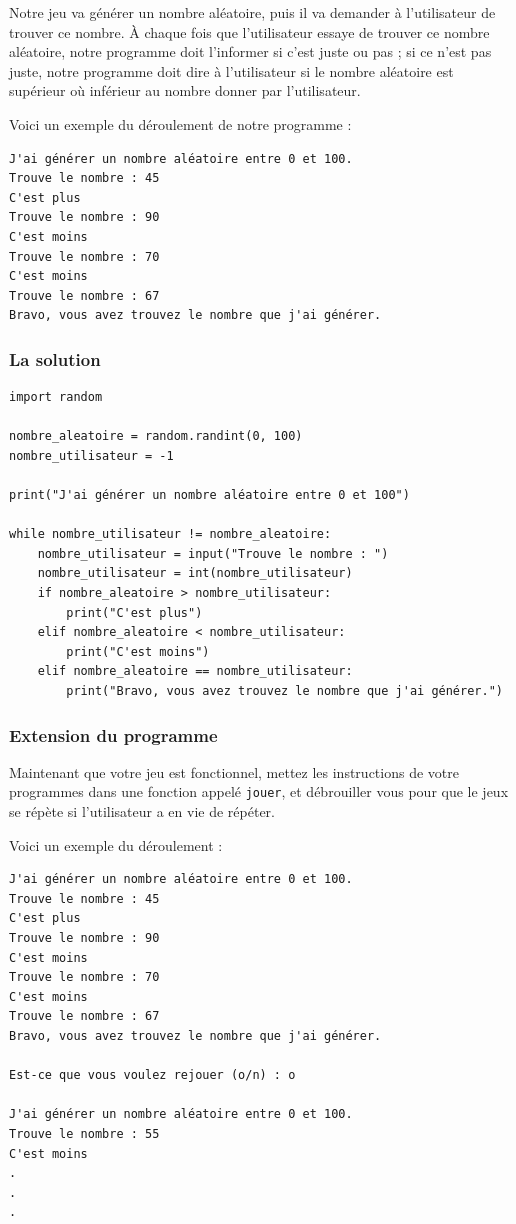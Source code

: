 \documentclass[12pt]{article}
\newcommand{\code}[1]{\colorbox{light-gray}{\texttt{#1}}}
\begin{document}
        Notre jeu va générer un nombre aléatoire, puis il va demander à l'utilisateur de trouver ce nombre. À chaque
        fois que l'utilisateur essaye de trouver ce nombre aléatoire, notre programme doit l'informer si c'est juste 
        ou pas ; si ce n'est pas juste, notre programme doit dire à l'utilisateur si le nombre aléatoire est supérieur 
        où inférieur au nombre donner par l'utilisateur. 

        Voici un exemple du déroulement de notre programme :
        \begin{lstlisting}[style=exec_result]
J'ai générer un nombre aléatoire entre 0 et 100.
Trouve le nombre : 45
C'est plus
Trouve le nombre : 90
C'est moins
Trouve le nombre : 70
C'est moins
Trouve le nombre : 67
Bravo, vous avez trouvez le nombre que j'ai générer.
        \end{lstlisting}

        \subsubsection{La solution}

        \begin{lstlisting}[style=code, breaklines=false]
import random

nombre_aleatoire = random.randint(0, 100)
nombre_utilisateur = -1

print("J'ai générer un nombre aléatoire entre 0 et 100")

while nombre_utilisateur != nombre_aleatoire:
    nombre_utilisateur = input("Trouve le nombre : ")
    nombre_utilisateur = int(nombre_utilisateur)
    if nombre_aleatoire > nombre_utilisateur:
        print("C'est plus")
    elif nombre_aleatoire < nombre_utilisateur:
        print("C'est moins")
    elif nombre_aleatoire == nombre_utilisateur:
        print("Bravo, vous avez trouvez le nombre que j'ai générer.")
        \end{lstlisting}

        \subsubsection{Extension du programme}
            Maintenant que votre jeu est fonctionnel, mettez les instructions de votre programmes dans une fonction appelé 
            \code{jouer}, et débrouiller vous pour que le jeux se répète si l'utilisateur a en vie de répéter.

            Voici un exemple du déroulement :
            \begin{lstlisting}[style=exec_result]
J'ai générer un nombre aléatoire entre 0 et 100.
Trouve le nombre : 45
C'est plus
Trouve le nombre : 90
C'est moins
Trouve le nombre : 70
C'est moins
Trouve le nombre : 67
Bravo, vous avez trouvez le nombre que j'ai générer.

Est-ce que vous voulez rejouer (o/n) : o

J'ai générer un nombre aléatoire entre 0 et 100.
Trouve le nombre : 55
C'est moins
.
.
.
        \end{lstlisting}        
\end{document}
